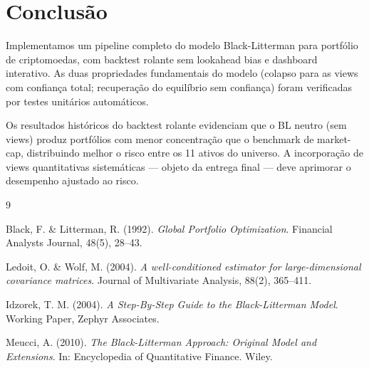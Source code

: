 \documentclass[12pt,a4paper]{article}
\begin{document}
\section{Conclusão}

Implementamos um pipeline completo do modelo Black-Litterman para portfólio
de criptomoedas, com backtest rolante sem lookahead bias e dashboard interativo.
As duas propriedades fundamentais do modelo (colapso para as views com confiança
total; recuperação do equilíbrio sem confiança) foram verificadas por testes
unitários automáticos.

Os resultados históricos do backtest rolante evidenciam que o BL neutro
(sem views) produz portfólios com menor concentração que o benchmark de
market-cap, distribuindo melhor o risco entre os 11 ativos do universo.
A incorporação de views quantitativas sistemáticas --- objeto da entrega
final --- deve aprimorar o desempenho ajustado ao risco.

\begin{thebibliography}{9}

Black, F. \& Litterman, R. (1992).
\textit{Global Portfolio Optimization}.
Financial Analysts Journal, 48(5), 28--43.

Ledoit, O. \& Wolf, M. (2004).
\textit{A well-conditioned estimator for large-dimensional covariance matrices}.
Journal of Multivariate Analysis, 88(2), 365--411.

Idzorek, T. M. (2004).
\textit{A Step-By-Step Guide to the Black-Litterman Model}.
Working Paper, Zephyr Associates.

Meucci, A. (2010).
\textit{The Black-Litterman Approach: Original Model and Extensions}.
In: Encyclopedia of Quantitative Finance. Wiley.

\end{thebibliography}
\end{document}
